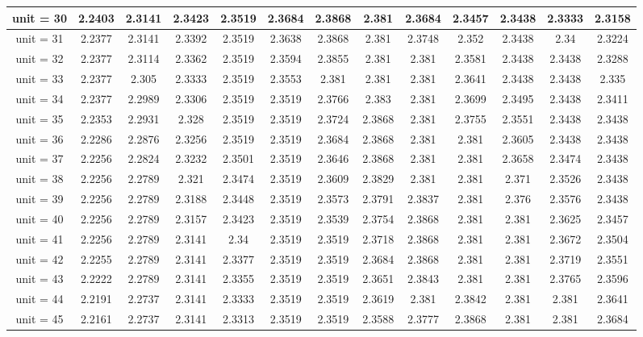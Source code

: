 \begin{table*}[ht]
\begin{tabular}{|c|c|c|c|c|c|c|c|c|c|c|c|c|}
\hline
unit = 30 &
2.2403 & 2.3141 & 2.3423 & 2.3519 & 2.3684 & 2.3868 & 2.381 & 2.3684 & 2.3457 & 2.3438 & 2.3333 & 2.3158 \\
\hline
unit = 31 &
2.2377 & 2.3141 & 2.3392 & 2.3519 & 2.3638 & 2.3868 & 2.381 & 2.3748 & 2.352 & 2.3438 & 2.34 & 2.3224 \\
\hline
unit = 32 &
2.2377 & 2.3114 & 2.3362 & 2.3519 & 2.3594 & 2.3855 & 2.381 & 2.381 & 2.3581 & 2.3438 & 2.3438 & 2.3288 \\
\hline
unit = 33 &
2.2377 & 2.305 & 2.3333 & 2.3519 & 2.3553 & 2.381 & 2.381 & 2.381 & 2.3641 & 2.3438 & 2.3438 & 2.335 \\
\hline
unit = 34 &
2.2377 & 2.2989 & 2.3306 & 2.3519 & 2.3519 & 2.3766 & 2.383 & 2.381 & 2.3699 & 2.3495 & 2.3438 & 2.3411 \\
\hline
unit = 35 &
2.2353 & 2.2931 & 2.328 & 2.3519 & 2.3519 & 2.3724 & 2.3868 & 2.381 & 2.3755 & 2.3551 & 2.3438 & 2.3438 \\
\hline
unit = 36 &
2.2286 & 2.2876 & 2.3256 & 2.3519 & 2.3519 & 2.3684 & 2.3868 & 2.381 & 2.381 & 2.3605 & 2.3438 & 2.3438 \\
\hline
unit = 37 &
2.2256 & 2.2824 & 2.3232 & 2.3501 & 2.3519 & 2.3646 & 2.3868 & 2.381 & 2.381 & 2.3658 & 2.3474 & 2.3438 \\
\hline
unit = 38 &
2.2256 & 2.2789 & 2.321 & 2.3474 & 2.3519 & 2.3609 & 2.3829 & 2.381 & 2.381 & 2.371 & 2.3526 & 2.3438 \\
\hline
unit = 39 &
2.2256 & 2.2789 & 2.3188 & 2.3448 & 2.3519 & 2.3573 & 2.3791 & 2.3837 & 2.381 & 2.376 & 2.3576 & 2.3438 \\
\hline
unit = 40 &
2.2256 & 2.2789 & 2.3157 & 2.3423 & 2.3519 & 2.3539 & 2.3754 & 2.3868 & 2.381 & 2.381 & 2.3625 & 2.3457 \\
\hline
unit = 41 &
2.2256 & 2.2789 & 2.3141 & 2.34 & 2.3519 & 2.3519 & 2.3718 & 2.3868 & 2.381 & 2.381 & 2.3672 & 2.3504 \\
\hline
unit = 42 &
2.2255 & 2.2789 & 2.3141 & 2.3377 & 2.3519 & 2.3519 & 2.3684 & 2.3868 & 2.381 & 2.381 & 2.3719 & 2.3551 \\
\hline
unit = 43 &
2.2222 & 2.2789 & 2.3141 & 2.3355 & 2.3519 & 2.3519 & 2.3651 & 2.3843 & 2.381 & 2.381 & 2.3765 & 2.3596 \\
\hline
unit = 44 &
2.2191 & 2.2737 & 2.3141 & 2.3333 & 2.3519 & 2.3519 & 2.3619 & 2.381 & 2.3842 & 2.381 & 2.381 & 2.3641 \\
\hline
unit = 45 &
2.2161 & 2.2737 & 2.3141 & 2.3313 & 2.3519 & 2.3519 & 2.3588 & 2.3777 & 2.3868 & 2.381 & 2.381 & 2.3684 \\

\end{tabular}
\end{table*}
